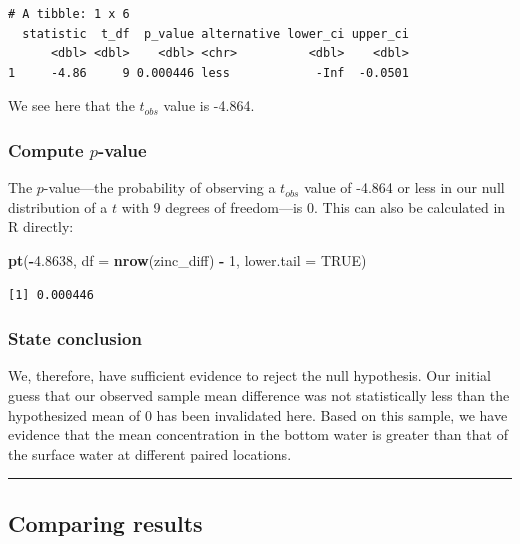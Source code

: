 \documentclass[12pt,]{krantz}
\makeatletter
\newenvironment{Shaded}{\begin{snugshade}}{\end{snugshade}}
\newcommand{\KeywordTok}[1]{\textcolor[rgb]{0.27,0.27,0.27}{\textbf{#1}}}
\newcommand{\DataTypeTok}[1]{\textcolor[rgb]{0.27,0.27,0.27}{#1}}
\newcommand{\DecValTok}[1]{\textcolor[rgb]{0.06,0.06,0.06}{#1}}
\newcommand{\FloatTok}[1]{\textcolor[rgb]{0.06,0.06,0.06}{#1}}
\newcommand{\StringTok}[1]{\textcolor[rgb]{0.5,0.5,0.5}{#1}}
\newcommand{\OtherTok}[1]{\textcolor[rgb]{0.37,0.37,0.37}{#1}}
\newcommand{\OperatorTok}[1]{\textcolor[rgb]{0.43,0.43,0.43}{\textbf{#1}}}
\newcommand{\NormalTok}[1]{#1}
\newenvironment{kframe}{%
\medskip{}
\setlength{\fboxsep}{.8em}
 \def\at@end@of@kframe{}%
 \ifinner\ifhmode%
  \def\at@end@of@kframe{\end{minipage}}%
  \begin{minipage}{\columnwidth}%
 \fi\fi%
 \def\FrameCommand##1{\hskip\@totalleftmargin \hskip-\fboxsep
 \colorbox{shadecolor}{##1}\hskip-\fboxsep
     \hskip-\linewidth \hskip-\@totalleftmargin \hskip\columnwidth}%
 \MakeFramed {\advance\hsize-\width
   \@totalleftmargin\z@ \linewidth\hsize
   \@setminipage}}%
 {\par\unskip\endMakeFramed%
 \at@end@of@kframe}
\renewenvironment{Shaded}{\begin{kframe}}{\end{kframe}}
\theoremstyle{definition}
\theoremstyle{definition}
\theoremstyle{definition}
\theoremstyle{remark}
\makeatother
\begin{document}
\begin{verbatim}
# A tibble: 1 x 6
  statistic  t_df  p_value alternative lower_ci upper_ci
      <dbl> <dbl>    <dbl> <chr>          <dbl>    <dbl>
1     -4.86     9 0.000446 less            -Inf  -0.0501
\end{verbatim}

We see here that the \(t_{obs}\) value is -4.864.

\subsubsection*{\texorpdfstring{Compute
\(p\)-value}{Compute p-value}}\label{compute-p-value-2}


The \(p\)-value---the probability of observing a \(t_{obs}\) value of
-4.864 or less in our null distribution of a \(t\) with 9 degrees of
freedom---is 0. This can also be calculated in R directly:

\begin{Shaded}
\begin{Highlighting}[]
\KeywordTok{pt}\NormalTok{(}\OperatorTok{-}\FloatTok{4.8638}\NormalTok{, }\DataTypeTok{df =} \KeywordTok{nrow}\NormalTok{(zinc_diff) }\OperatorTok{-}\StringTok{ }\DecValTok{1}\NormalTok{, }\DataTypeTok{lower.tail =} \OtherTok{TRUE}\NormalTok{)}
\end{Highlighting}
\end{Shaded}

\begin{verbatim}
[1] 0.000446
\end{verbatim}

\subsubsection*{State conclusion}\label{state-conclusion-4}


We, therefore, have sufficient evidence to reject the null hypothesis.
Our initial guess that our observed sample mean difference was not
statistically less than the hypothesized mean of 0 has been invalidated
here. Based on this sample, we have evidence that the mean concentration
in the bottom water is greater than that of the surface water at
different paired locations.

\begin{center}\rule{0.5\linewidth}{\linethickness}\end{center}

\subsection{Comparing results}\label{comparing-results-4}
\end{document}
